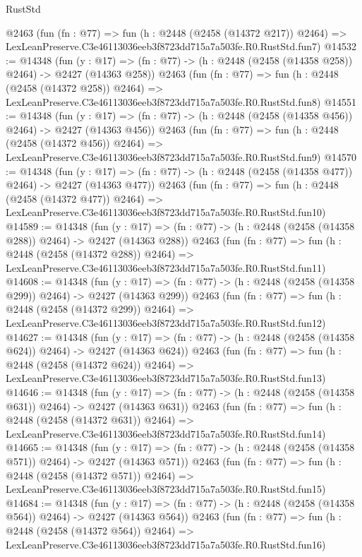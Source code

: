 \begin{lexlean}{RustStd}
\begin{coremodule}
    @2463
    (fun (fn : @77) =>
    fun (h : @2448 (@2458 (@14372 @217)) @2464) =>
    LexLeanPreserve.C3e46113036eeb3f8723dd715a7a503fe.R0.RustStd.fun7)
@14532 := @14348
    (fun (y : @17) => (fn : @77) -> (h : @2448 (@2458 (@14358 @258)) @2464) -> @2427 (@14363 @258))
    @2463
    (fun (fn : @77) =>
    fun (h : @2448 (@2458 (@14372 @258)) @2464) =>
    LexLeanPreserve.C3e46113036eeb3f8723dd715a7a503fe.R0.RustStd.fun8)
@14551 := @14348
    (fun (y : @17) => (fn : @77) -> (h : @2448 (@2458 (@14358 @456)) @2464) -> @2427 (@14363 @456))
    @2463
    (fun (fn : @77) =>
    fun (h : @2448 (@2458 (@14372 @456)) @2464) =>
    LexLeanPreserve.C3e46113036eeb3f8723dd715a7a503fe.R0.RustStd.fun9)
@14570 := @14348
    (fun (y : @17) => (fn : @77) -> (h : @2448 (@2458 (@14358 @477)) @2464) -> @2427 (@14363 @477))
    @2463
    (fun (fn : @77) =>
    fun (h : @2448 (@2458 (@14372 @477)) @2464) =>
    LexLeanPreserve.C3e46113036eeb3f8723dd715a7a503fe.R0.RustStd.fun10)
@14589 := @14348
    (fun (y : @17) => (fn : @77) -> (h : @2448 (@2458 (@14358 @288)) @2464) -> @2427 (@14363 @288))
    @2463
    (fun (fn : @77) =>
    fun (h : @2448 (@2458 (@14372 @288)) @2464) =>
    LexLeanPreserve.C3e46113036eeb3f8723dd715a7a503fe.R0.RustStd.fun11)
@14608 := @14348
    (fun (y : @17) => (fn : @77) -> (h : @2448 (@2458 (@14358 @299)) @2464) -> @2427 (@14363 @299))
    @2463
    (fun (fn : @77) =>
    fun (h : @2448 (@2458 (@14372 @299)) @2464) =>
    LexLeanPreserve.C3e46113036eeb3f8723dd715a7a503fe.R0.RustStd.fun12)
@14627 := @14348
    (fun (y : @17) => (fn : @77) -> (h : @2448 (@2458 (@14358 @624)) @2464) -> @2427 (@14363 @624))
    @2463
    (fun (fn : @77) =>
    fun (h : @2448 (@2458 (@14372 @624)) @2464) =>
    LexLeanPreserve.C3e46113036eeb3f8723dd715a7a503fe.R0.RustStd.fun13)
@14646 := @14348
    (fun (y : @17) => (fn : @77) -> (h : @2448 (@2458 (@14358 @631)) @2464) -> @2427 (@14363 @631))
    @2463
    (fun (fn : @77) =>
    fun (h : @2448 (@2458 (@14372 @631)) @2464) =>
    LexLeanPreserve.C3e46113036eeb3f8723dd715a7a503fe.R0.RustStd.fun14)
@14665 := @14348
    (fun (y : @17) => (fn : @77) -> (h : @2448 (@2458 (@14358 @571)) @2464) -> @2427 (@14363 @571))
    @2463
    (fun (fn : @77) =>
    fun (h : @2448 (@2458 (@14372 @571)) @2464) =>
    LexLeanPreserve.C3e46113036eeb3f8723dd715a7a503fe.R0.RustStd.fun15)
@14684 := @14348
    (fun (y : @17) => (fn : @77) -> (h : @2448 (@2458 (@14358 @564)) @2464) -> @2427 (@14363 @564))
    @2463
    (fun (fn : @77) =>
    fun (h : @2448 (@2458 (@14372 @564)) @2464) =>
    LexLeanPreserve.C3e46113036eeb3f8723dd715a7a503fe.R0.RustStd.fun16)

\end{coremodule}
\end{lexlean}
